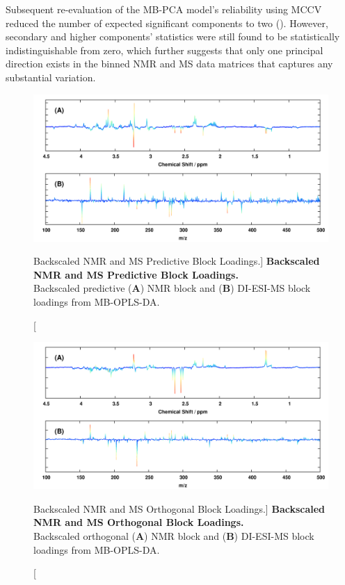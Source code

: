 \begin{doublespace}
Subsequent re-evaluation of the MB-PCA model's reliability using MCCV reduced
the number of expected significant components to two
(). However, secondary and higher
components' \qsq{} statistics were still found to be
statistically indistinguishable from zero, which further suggests that only
one principal direction exists in the binned NMR and MS data matrices that
captures any substantial variation.
\end{doublespace}

\begin{figure}[ht!]
\includegraphics[width=6in]{figs/apps/12-mbopls-p.png}
\caption
      [Backscaled NMR and MS Predictive Block Loadings.]{
  {\bf Backscaled NMR and MS Predictive Block Loadings.}
  \\
  Backscaled predictive ({\bf A}) \hnmr{} NMR block and ({\bf B}) DI-ESI-MS
  block loadings from MB-OPLS-DA.
}
\label{figure.4.12}
\end{figure}

\begin{figure}[ht!]
\includegraphics[width=6in]{figs/apps/13-mbopls-po.png}
\caption
      [Backscaled NMR and MS Orthogonal Block Loadings.]{
  {\bf Backscaled NMR and MS Orthogonal Block Loadings.}
  \\
  Backscaled orthogonal ({\bf A}) \hnmr{} NMR block and ({\bf B}) DI-ESI-MS
  block loadings from MB-OPLS-DA.
}
\label{figure.4.13}
\end{figure}

